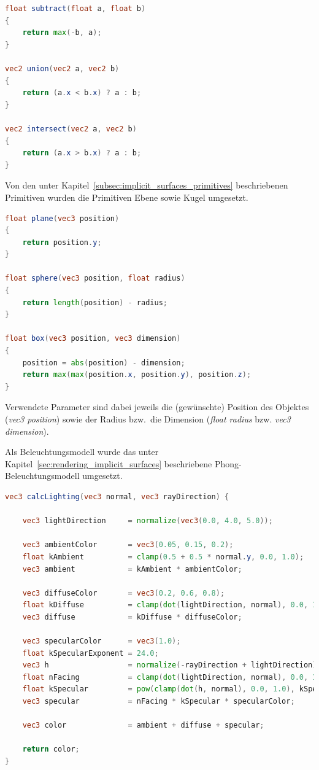 \begin{lstlisting}[language=GLSL,caption={Umsetzung von Operationen für implizite Oberflächen in GLSL.},label={alg:glsl_ops},captionpos=b,emph={subtract,union,intersect}]
float subtract(float a, float b)
{
    return max(-b, a);
}

vec2 union(vec2 a, vec2 b)
{
    return (a.x < b.x) ? a : b;
}

vec2 intersect(vec2 a, vec2 b)
{
    return (a.x > b.x) ? a : b;
}
\end{lstlisting}

Von den unter Kapitel~\ref{subsec:implicit_surfaces_primitives} beschriebenen
Primitiven wurden die Primitiven Ebene sowie Kugel umgesetzt.

\begin{lstlisting}[language=GLSL,caption={Umsetzung von Primitiven in Form von impliziten Oberflächen in GLSL.},label={alg:glsl_primitives},captionpos=b,emph={plane,sphere,box}]
float plane(vec3 position)
{
    return position.y;
}

float sphere(vec3 position, float radius)
{
    return length(position) - radius;
}

float box(vec3 position, vec3 dimension)
{
    position = abs(position) - dimension;
    return max(max(position.x, position.y), position.z);
}
\end{lstlisting}

Verwendete Parameter sind dabei jeweils die (gewünschte) Position des Objektes
(\textit{vec3 position}) sowie der Radius bzw.\ die Dimension
(\textit{float radius} bzw. \textit{vec3 dimension}).

Als Beleuchtungsmodell wurde das unter
Kapitel~\ref{sec:rendering_implicit_surfaces} beschriebene
Phong-Beleuchtungsmodell umgesetzt.


\begin{lstlisting}[language=GLSL,caption={Umsetzung des Phong-Beleuchtungsmodelles in GLSL.},label={alg:glsl_lighting},captionpos=b,emph={calcLighting}]
vec3 calcLighting(vec3 normal, vec3 rayDirection) {

    vec3 lightDirection     = normalize(vec3(0.0, 4.0, 5.0));

    vec3 ambientColor       = vec3(0.05, 0.15, 0.2);
    float kAmbient          = clamp(0.5 + 0.5 * normal.y, 0.0, 1.0);
    vec3 ambient            = kAmbient * ambientColor;

    vec3 diffuseColor       = vec3(0.2, 0.6, 0.8);
    float kDiffuse          = clamp(dot(lightDirection, normal), 0.0, 1.0);
    vec3 diffuse            = kDiffuse * diffuseColor;

    vec3 specularColor      = vec3(1.0);
    float kSpecularExponent = 24.0;
    vec3 h                  = normalize(-rayDirection + lightDirection);
    float nFacing           = clamp(dot(lightDirection, normal), 0.0, 1.0);
    float kSpecular         = pow(clamp(dot(h, normal), 0.0, 1.0), kSpecularExponent);
    vec3 specular           = nFacing * kSpecular * specularColor;

    vec3 color              = ambient + diffuse + specular;

    return color;
}
\end{lstlisting}

